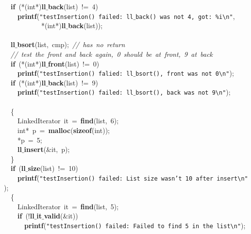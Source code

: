 \documentclass{article}
\begin{document}
\mbox{}\ \ \textbf{if}\ (*(int*)\textbf{ll$\_$back}(list)\ !=\ 4) \\
\mbox{}\ \ \ \ \textbf{printf}(\texttt{"{}testInsertion()\ failed:\ ll$\_$back()\ was\ not\ 4,\ got:\ \%i}\texttt{\textbackslash{}n}\texttt{"{}}, \\
\mbox{}\ \ \ \ \ \ \ \ \ \ \ *(int*)\textbf{ll$\_$back}(list)); \\
\mbox{} \\
\mbox{}\ \ \textbf{ll$\_$bsort}(list,\ cmp);\ \textit{//\ has\ no\ return} \\
\mbox{}\ \ \textit{//\ test\ the\ front\ and\ back\ again,\ 0\ should\ be\ at\ front,\ 9\ at\ back} \\
\mbox{}\ \ \textbf{if}\ (*(int*)\textbf{ll$\_$front}(list)\ !=\ 0) \\
\mbox{}\ \ \ \ \textbf{printf}(\texttt{"{}testInsertion()\ falied:\ ll$\_$bsort(),\ front\ was\ not\ 0}\texttt{\textbackslash{}n}\texttt{"{}}); \\
\mbox{}\ \ \textbf{if}\ (*(int*)\textbf{ll$\_$back}(list)\ !=\ 9) \\
\mbox{}\ \ \ \ \textbf{printf}(\texttt{"{}testInsertion()\ failed:\ ll$\_$bsort(),\ back\ was\ not\ 9}\texttt{\textbackslash{}n}\texttt{"{}}); \\
\mbox{} \\
\mbox{}\ \ \{ \\
\mbox{}\ \ \ \ LinkedIterator\ it\ =\ \textbf{find}(list,\ 6); \\
\mbox{}\ \ \ \ int*\ p\ =\ \textbf{malloc}(\textbf{sizeof}(int)); \\
\mbox{}\ \ \ \ *p\ =\ 5; \\
\mbox{}\ \ \ \ \textbf{ll$\_$insert}(\&it,\ p); \\
\mbox{}\ \ \} \\
\mbox{}\ \ \textbf{if}\ (\textbf{ll$\_$size}(list)\ !=\ 10) \\
\mbox{}\ \ \ \ \textbf{printf}(\texttt{"{}testInsertion()\ failed:\ List\ size\ wasn't\ 10\ after\ insert}\texttt{\textbackslash{}n}\texttt{"{}}); \\
\mbox{}\ \ \{ \\
\mbox{}\ \ \ \ LinkedIterator\ it\ =\ \textbf{find}(list,\ 5); \\
\mbox{}\ \ \ \ \textbf{if}\ (!\textbf{ll$\_$it$\_$valid}(\&it)) \\
\mbox{}\ \ \ \ \ \ \textbf{printf}(\texttt{"{}testInsertion()\ failed:\ Failed\ to\ find\ 5\ in\ the\ list}\texttt{\textbackslash{}n}\texttt{"{}}); \\
\end{document}
